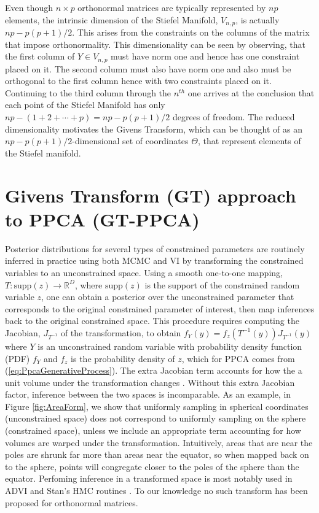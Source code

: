 \documentclass{article}
\begin{document}
Even though $n \times p$ orthonormal matrices are typically represented by $np$ elements, the intrinsic dimension of the Stiefel Manifold, $V_{n,p}$, is actually $np-p(p+1)/2$. This arises from the constraints on the columns of the matrix that impose orthonormality.  This dimensionality can be seen by observing, that the first column of $Y \in V_{n,p}$ must have norm one and hence has one constraint placed on it. The second column must also have norm one and also must be orthogonal to the first column hence with two constraints placed on it.  Continuing to the third column through the $n^{th}$ one arrives at the conclusion that each point of the Stiefel Manifold has only $np - (1+2+\cdots+p) =np-p(p+1)/2$ degrees of freedom.  The reduced dimensionality motivates the Givens Transform, which can be thought of as an $np-p(p+1)/2$-dimensional set of coordinates $\Theta$, that represent elements of the Stiefel manifold.

\section{Givens Transform (GT) approach to PPCA (GT-PPCA)} \label{Givens}

Posterior distributions for several types of constrained parameters are routinely inferred in practice using both MCMC and VI by transforming the constrained variables to an unconstrained space. Using a smooth one-to-one mapping, $T: \mathrm{supp}(z) \to \mathbb{R}^D$, where $\mathrm{supp}(z)$ is the support of the constrained random variable $z$, one can obtain a posterior over the unconstrained parameter that corresponds to the original constrained parameter of interest, then map inferences back to the original constrained space. This procedure requires computing the Jacobian, $J_{T^{-1}}$ of the transformation, to obtain $f_{Y}(y) = f_{z}(T^{-1}(y)) J_{T^{-1}}(y)$ where $Y$ is an unconstrained random variable with probability density function (PDF) $f_Y$ and $f_{z}$ is the probability density of $z$, which for PPCA comes from (\ref{eq:PpcaGenerativeProcess}). The extra Jacobian term accounts for how the a unit volume under the transformation changes \citep{kucukelbir2014fully}. Without this extra Jacobian factor, inference between the two spaces is incomparable. As an example, in Figure \ref{fig:AreaForm}, we show that uniformly sampling in spherical coordinates (unconstrained space) does not correspond to uniformly sampling on the sphere (constrained space), unless we include an appropriate term accounting for how volumes are warped under the transformation. Intuitively, areas that are near the poles are shrunk far more than areas near the equator, so when mapped back on to the sphere, points will congregate closer to the poles of the sphere than the equator. Perfoming inference in a transformed space is most notably used in ADVI and Stan's HMC routines \citep{carpenter2016stan, kucukelbir2014fully}. To our knowledge no such transform has been proposed for orthonormal matrices.
\end{document}
